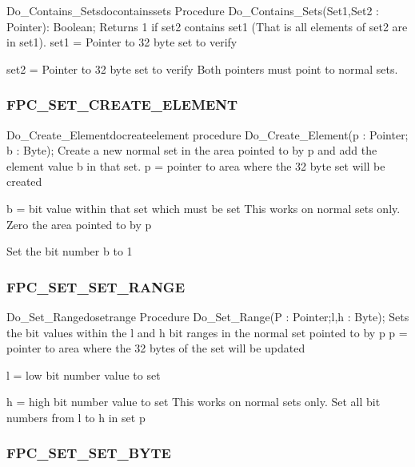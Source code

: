 \documentclass [12pt]{article}
\begin{document}
\begin{procedurel}{Do{\_}Contains{\_}Sets}{docontainssets}
\Declaration
Procedure Do{\_}Contains{\_}Sets(Set1,Set2 : Pointer): Boolean;
\Description 
Returns 1 if set2 contains set1 (That is all elements of set2 are in set1). 
\Parameters 
set1 = Pointer to 32 byte set to verify \par
set2 = Pointer to 32 byte set to verify 
\Notes 
Both pointers must point to normal sets. 
\end{procedurel}

\subsubsection{FPC{\_}SET{\_}CREATE{\_}ELEMENT}
\label{subsubsec:mylabel88}

\begin{procedurel}{Do{\_}Create{\_}Element}{docreateelement}
\Declaration
procedure Do{\_}Create{\_}Element(p : Pointer; b : Byte);
\Description 
Create a new normal set in the area pointed to by \textsf{p} and add the
element value \textsf{b} in that set.
\Parameters 
p = pointer to area where the 32 byte set will be created \par
b = bit value within that set which must be set 
\Notes 
This works on normal sets only. 
\Algorithm 
Zero the area pointed to by p \par 
Set the bit number b to 1
\end{procedurel}

\subsubsection{FPC{\_}SET{\_}SET{\_}RANGE}
\label{subsubsec:mylabel89}

\begin{procedurel}{Do{\_}Set{\_}Range}{dosetrange}
\Declaration
Procedure Do{\_}Set{\_}Range(P : Pointer;l,h : Byte);
\Description 
Sets the bit values within the \textsf{l} and \textsf{h }bit ranges in the
normal set pointed to by \textsf{p}
\Parameters 
p = pointer to area where the 32 bytes of the set will be updated \par
l = low bit number value to set \par
h = high bit number value to set 
\Notes 
This works on normal sets only. 
\Algorithm 
Set all bit numbers from l to h in set p
\end{procedurel}

\subsubsection{FPC{\_}SET{\_}SET{\_}BYTE}
\label{subsubsec:mylabel90}
\end{document}
